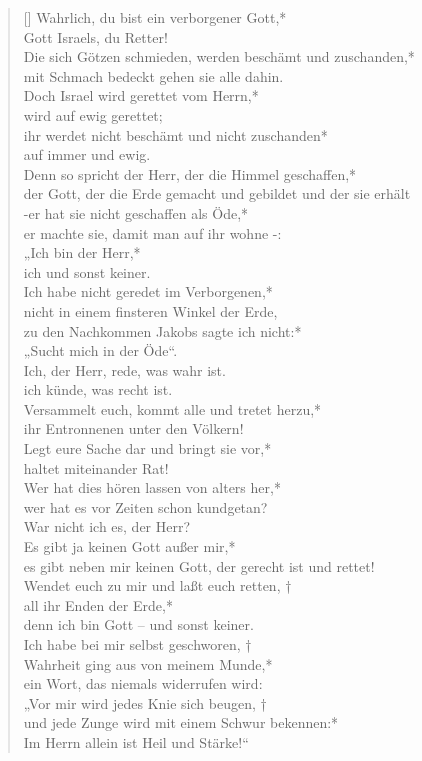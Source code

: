 \begin{verse}[\versewidth]
 Wahrlich, du bist ein verborgener Gott,*\\
Gott Israels, du Retter!\\
\vin Die sich Götzen schmieden, werden beschämt und zuschanden,*\\
\vin mit Schmach bedeckt gehen sie alle dahin.\\
Doch Israel wird gerettet vom Herrn,*\\
wird auf ewig gerettet;\\
\vin ihr werdet nicht beschämt und nicht zuschanden*\\
\vin auf immer und ewig.\\
Denn so spricht der Herr, der die Himmel geschaffen,*\\
der Gott, der die Erde gemacht und gebildet und der sie erhält\\
\vin -er hat sie nicht geschaffen als Öde,*\\
\vin er machte sie, damit man auf ihr wohne -:\\
„Ich bin der Herr,*\\
ich und sonst keiner.\\
\vin Ich habe nicht geredet im Verborgenen,*\\
\vin nicht in einem finsteren Winkel der Erde,\\
zu den Nachkommen Jakobs sagte ich nicht:*\\
„Sucht mich in der Öde“.\\
\vin Ich, der Herr, rede, was wahr ist.\\
\vin ich künde, was recht ist.\\

Versammelt euch, kommt alle und tretet herzu,*\\
ihr Entronnenen unter den Völkern!\\
\vin Legt eure Sache dar und bringt sie vor,*\\
\vin haltet miteinander Rat!\\
Wer hat dies hören lassen von alters her,*\\
wer hat es vor Zeiten schon kundgetan?\\
\vin War nicht ich es, der Herr?\\
\vin Es gibt ja keinen Gott außer mir,*\\
\vin es gibt neben mir keinen Gott, der gerecht ist und rettet!\\
Wendet euch zu mir und laßt euch retten, †\\
all ihr Enden der Erde,*\\
denn ich bin Gott – und sonst keiner.\\
\vin Ich habe bei mir selbst geschworen, †\\
\vin Wahrheit ging aus von meinem Munde,*\\
\vin ein Wort, das niemals widerrufen wird:\\
„Vor mir wird jedes Knie sich beugen, †\\
und jede Zunge wird mit einem Schwur bekennen:*\\
Im Herrn allein ist Heil und Stärke!“\\


\end{verse}
